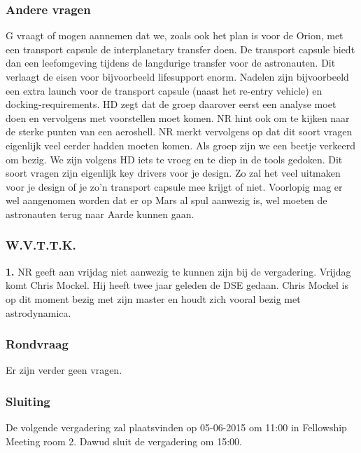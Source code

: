 \subsubsection{Andere vragen}
G vraagt of mogen aannemen dat we, zoals ook het plan is voor de Orion, met een transport capsule de interplanetary transfer doen. De transport capsule biedt dan een leefomgeving tijdens de langdurige transfer voor de astronauten. Dit verlaagt de eisen voor bijvoorbeeld lifesupport enorm. Nadelen zijn bijvoorbeeld een extra launch voor de transport capsule (naast het re-entry vehicle) en docking-requirements. HD zegt dat de groep daarover eerst een analyse moet doen en vervolgens met voorstellen moet komen. NR hint ook om te kijken naar de sterke punten van een aeroshell.
\newline
NR merkt vervolgens op dat dit soort vragen eigenlijk veel eerder hadden moeten komen. Als groep zijn we een beetje verkeerd om bezig. We zijn volgens HD iets te vroeg en te diep in de tools gedoken. Dit soort vragen zijn eigenlijk key drivers voor je design. Zo zal het veel uitmaken voor je design of je zo'n transport capsule mee krijgt of niet. Voorlopig mag er wel aangenomen worden dat er op Mars al spul aanwezig is, wel moeten de astronauten terug naar Aarde kunnen gaan.

\subsubsection{W.V.T.T.K.}

\textbf{1.} NR geeft aan vrijdag niet aanwezig te kunnen zijn bij de vergadering. Vrijdag komt Chris Mockel. Hij heeft twee jaar geleden de DSE gedaan. Chris Mockel is op dit moment bezig met zijn master en houdt zich vooral bezig met astrodynamica.

\subsubsection{Rondvraag}
Er zijn verder geen vragen.

\subsubsection{Sluiting}
De volgende vergadering zal plaatsvinden op 05-06-2015 om 11:00 in Fellowship Meeting room 2.
\newline\newline
Dawud sluit de vergadering om 15:00.